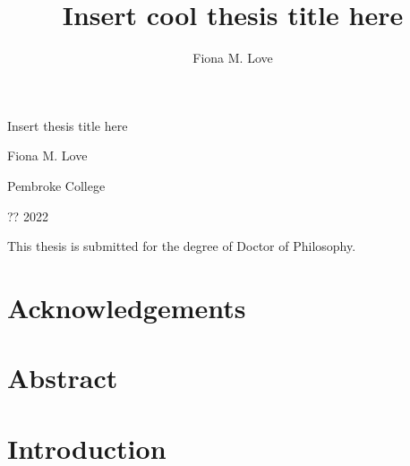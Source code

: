 \documentclass[
]{book}
\title{Insert cool thesis title here}
\author{Fiona M. Love}
\date{}
\begin{document}
\maketitle

\begin{titlepage}
\begin{center}

  \hspace{0pt}
  \vfill
  
  {\Huge
  Insert thesis title here
  }\par
  
  {\Large
  Fiona M. Love
  }\par
  
   \vspace{1\baselineskip}
  
  {Pembroke College}\par
  {?? 2022}\par
  
  \vspace{4\baselineskip}
  
  {This thesis is submitted for the degree of Doctor of Philosophy.}\par
  
  \vfill
  \hspace{0pt}

\end{center}
\end{titlepage}

\hypertarget{ACKNOWLEDGEMENTS}{%
\chapter*{Acknowledgements}\label{ACKNOWLEDGEMENTS}}


\hypertarget{ABSTRACT}{%
\chapter*{Abstract}\label{ABSTRACT}}



\tableofcontents

\hypertarget{INTRODUCTION}{%
\chapter*{Introduction}\label{INTRODUCTION}}
\end{document}

